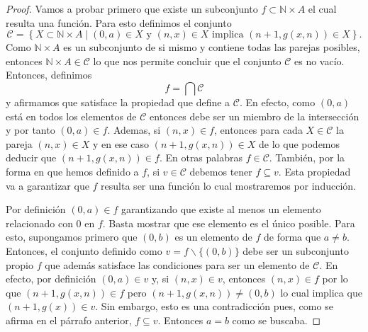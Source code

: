 \documentclass[letter,10pt,notitlepage]{amsart}
\theoremstyle{definition}
\theoremstyle{remark}
\begin{document}
\begin{proof}
  Vamos a probar primero que 
  existe un subconjunto \( f \subset \mathbb{N} \times A \)
  el cual resulta una función. Para esto definimos el conjunto
  \[ \mathcal{C} = \left\{ X \subset \mathbb{N} \times A \mid (0,a) \in X \text{ y } (n,x)\in X\text{ implica }(n+1,g(x,n))\in X \right\}. \]
  Como \( \mathbb{N} \times A\) es un subconjunto de si mismo y contiene todas las parejas posibles, entonces
  \( \mathbb{N} \times A \in \mathcal{C}\) lo que nos permite
   concluir que el conjunto \( \mathcal{C} \) es no vacío. Entonces,
  definimos \[ f = \bigcap \mathcal{C} \] y afirmamos que satisface la propiedad que define a \( \mathcal{C} \). 
  En efecto, como \( (0,a)\) está en todos los elementos de \( \mathcal{C}\) entonces
  debe ser un miembro de la intersección y por tanto \( (0,a) \in f\). Ademas,
  si \( (n,x) \in f \), entonces para cada \( X \in \mathcal{C} \)
  la pareja \( (n,x) \in X \) y en ese caso \( (n+1,g(x,n))\in X \) de lo que podemos deducir 
  que \( (n+1,g(x,n)) \in f \). En otras palabras \( f \in \mathcal{C} \). También, por 
  la forma en que hemos definido a \( f\), si  \( v\in \mathcal{C} \) debemos tener  \( f \subseteq v \).
  Esta propiedad va a garantizar que \( f\) resulta ser una función lo
  cual mostraremos por inducción.
  
  Por definición \( (0,a) \in f\) garantizando que existe al menos un elemento
  relacionado con \( 0\) en \( f\). Basta mostrar que ese elemento
  es el único posible. Para esto, supongamos primero que \( (0,b)\) es un elemento
  de \( f\) de forma que \( a \neq b\). Entonces, el conjunto definido como 
  \( v = f \backslash\{(0,b)\}\) debe ser un subconjunto propio \( f\) que además 
  satisface las condiciones para ser un elemento de \( \mathcal{C}\). En efecto,
  por definición  \( (0,a) \in v\) y,
  si \( (n,x) \in v \), entonces \( (n,x) \in f \) por lo que  \( (n+1,g(x,n)) \in f \) pero
  \( (n+1,g(x,n))\neq (0,b) \) lo cual implica que \( (n+1,g(x)) \in v\).
  Sin embargo, esto es una contradicción pues, como se afirma en el
  párrafo anterior, \( f \subseteq v\). Entonces \( a = b\) como
  se buscaba.


\end{proof}
\end{document}
